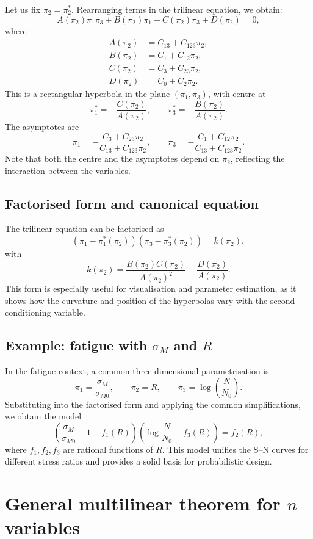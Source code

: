 Let us fix \(\pi_2=\pi_2^*\). Rearranging terms in the trilinear equation, we obtain:
\[
A(\pi_2)\pi_1\pi_3 + B(\pi_2)\pi_1 + C(\pi_2)\pi_3 + D(\pi_2) = 0,
\]
where
\begin{align*}
A(\pi_2) &= C_{13} + C_{123}\pi_2,\\
B(\pi_2) &= C_1 + C_{12}\pi_2,\\
C(\pi_2) &= C_3 + C_{23}\pi_2,\\
D(\pi_2) &= C_0 + C_2\pi_2.
\end{align*}
This is a rectangular hyperbola in the plane \((\pi_1,\pi_3)\), with centre at
\[
\pi_1^* = -\frac{C(\pi_2)}{A(\pi_2)},\qquad \pi_3^* = -\frac{B(\pi_2)}{A(\pi_2)}.
\]
The asymptotes are
\[
\pi_1 = -\frac{C_3 + C_{23}\pi_2}{C_{13} + C_{123}\pi_2},\qquad
\pi_3 = -\frac{C_1 + C_{12}\pi_2}{C_{13} + C_{123}\pi_2}.
\]
Note that both the centre and the asymptotes depend on \(\pi_2\), reflecting the interaction between the variables.

\subsection{Factorised form and canonical equation}

The trilinear equation can be factorised as
\[
(\pi_1 - \pi_1^*(\pi_2))(\pi_3 - \pi_3^*(\pi_2)) = k(\pi_2),
\]
with
\[
k(\pi_2) = \frac{B(\pi_2)C(\pi_2)}{A(\pi_2)^2} - \frac{D(\pi_2)}{A(\pi_2)}.
\]
This form is especially useful for visualisation and parameter estimation, as it shows how the curvature and position of the hyperbolas vary with the second conditioning variable.

\subsection{Example: fatigue with \(\sigma_M\) and \(R\)}

In the fatigue context, a common three-dimensional parametrisation is
\[
\pi_1 = \frac{\sigma_M}{\sigma_{M0}},\qquad \pi_2 = R,\qquad \pi_3 = \log\left(\frac{N}{N_0}\right).
\]
Substituting into the factorised form and applying the common simplifications, we obtain the model
\[
\left(\frac{\sigma_M}{\sigma_{M0}} - 1 - f_1(R)\right)\left(\log\frac{N}{N_0} - f_3(R)\right) = f_2(R),
\]
where \(f_1,f_2,f_3\) are rational functions of \(R\). This model unifies the S–N curves for different stress ratios and provides a solid basis for probabilistic design.

\section{General multilinear theorem for \(n\) variables}
\label{sec:multilinear-general}

